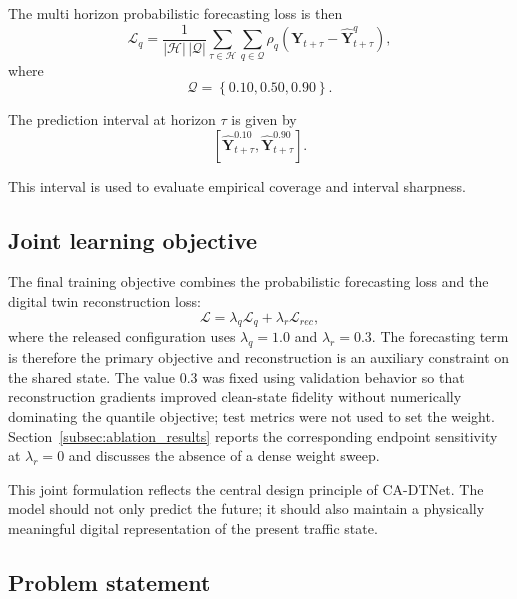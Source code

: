\documentclass[pdflatex,sn-mathphys-num]{sn-jnl}%
\theoremstyle{thmstyleone}%
\theoremstyle{thmstyletwo}%
\theoremstyle{thmstylethree}%
\begin{document}
The multi horizon probabilistic forecasting loss is then
\begin{equation}
    \mathcal{L}_{q}
    =
    \frac{1}{|\mathcal{H}|\,|\mathcal{Q}|}
    \sum_{\tau\in\mathcal{H}}
    \sum_{q\in\mathcal{Q}}
    \rho_{q}
    \left(
    \mathbf{Y}_{t+\tau}
    -
    \widehat{\mathbf{Y}}_{t+\tau}^{q}
    \right),
\end{equation}
where
\begin{equation}
    \mathcal{Q} = \left\{0.10, 0.50, 0.90\right\}.
\end{equation}

The prediction interval at horizon \(\tau\) is given by
\begin{equation}
    \left[
    \widehat{\mathbf{Y}}_{t+\tau}^{0.10},
    \widehat{\mathbf{Y}}_{t+\tau}^{0.90}
    \right].
\end{equation}

This interval is used to evaluate empirical coverage and interval sharpness.

\subsection{Joint learning objective}

The final training objective combines the probabilistic forecasting loss and the digital twin reconstruction loss:
\begin{equation}
    \mathcal{L}
    =
    \lambda_{q}\mathcal{L}_{q}
    +
    \lambda_{r}\mathcal{L}_{rec},
\end{equation}
where the released configuration uses \(\lambda_q=1.0\) and \(\lambda_r=0.3\). The forecasting term is therefore the primary objective and reconstruction is an auxiliary constraint on the shared state. The value 0.3 was fixed using validation behavior so that reconstruction gradients improved clean-state fidelity without numerically dominating the quantile objective; test metrics were not used to set the weight. Section~\ref{subsec:ablation_results} reports the corresponding endpoint sensitivity at \(\lambda_r=0\) and discusses the absence of a dense weight sweep.

This joint formulation reflects the central design principle of CA-DTNet. The model should not only predict the future; it should also maintain a physically meaningful digital representation of the present traffic state.

\subsection{Problem statement}
\end{document}
